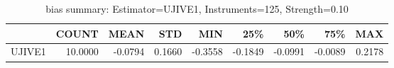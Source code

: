 \begin{table}[ht]
\centering
\caption{bias summary: Estimator=UJIVE1, Instruments=125, Strength=0.10}
\begin{tabular}{lrrrrrrrr}
\toprule
 & COUNT & MEAN & STD & MIN & 25\% & 50\% & 75\% & MAX \\
\midrule
UJIVE1 & 10.0000 & -0.0794 & 0.1660 & -0.3558 & -0.1849 & -0.0991 & -0.0089 & 0.2178 \\
\bottomrule
\end{tabular}
\end{table}
